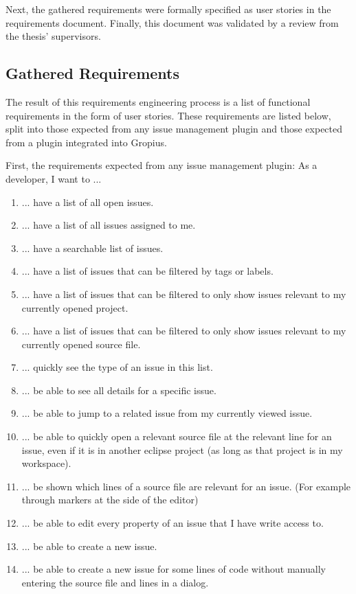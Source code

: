 Next, the gathered requirements were formally specified as user stories in the requirements document.
Finally, this document was validated by a review from the thesis' supervisors.


\subsection*{Gathered Requirements}
The result of this requirements engineering process is a list of functional requirements in the form of user stories.
These requirements are listed below, split into those expected from any issue management plugin and those expected from a plugin integrated into \gls{Gropius}.


First, the requirements expected from any issue management plugin:
As a developer, I want to ...
\begin{enumerate}
	\item ... have a list of all open issues. \label{itm:ch3:req:filter_open}
	\item ... have a list of all issues assigned to me. \label{itm:ch3:req:filter_me}
	\item ... have a searchable list of issues. \label{itm:ch3:req:filter_search}
	\item ... have a list of issues that can be filtered by tags or labels. \label{itm:ch3:req:filter_labels}
	\item ... have a list of issues that can be filtered to only show issues relevant to my currently opened project. \label{itm:ch3:req:filter_open project}
	\item ... have a list of issues that can be filtered to only show issues relevant to my currently opened source file. \label{itm:ch3:req:filter_open_file}
	\item ... quickly see the type of an issue in this list. \label{itm:ch3:req:list_issue_type}
	\item ... be able to see all details for a specific issue.
	\item ... be able to jump to a related issue from my currently viewed issue.
	\item ... be able to quickly open a relevant source file at the relevant line for an issue, even if it is in another eclipse project (as long as that project is in my workspace).
	\item ... be shown which lines of a source file are relevant for an issue. (For example through markers at the side of the editor) \label{itm:ch3:req:source_file_marker}
	\item ... be able to edit every property of an issue that I have write access to.
	\item ... be able to create a new issue.
	\item ... be able to create a new issue for some lines of code without manually entering the source file and lines in a dialog.
	\setcounter{enumarteCounter}{\value{enumi}} %
\end{enumerate}

